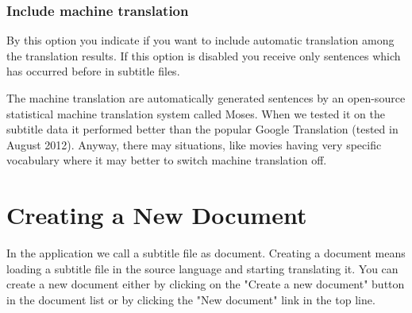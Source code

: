 \subsubsection{Include machine translation}

By this option you indicate if you want to include automatic translation among the translation results. If this option is disabled you receive only sentences which has occurred before in subtitle files.

The machine translation are automatically generated sentences by an open-source statistical machine translation system called Moses. When we tested it on the subtitle data it performed better than the popular Google Translation (tested in August 2012). Anyway, there may situations, like movies having very specific vocabulary where it may better to switch machine translation off.

\section{Creating a New Document}

In the application we call a subtitle file as document. Creating a document means loading a subtitle file in the source language and starting translating it. You can create a new document either by clicking on the "Create a new document" button in the document list or by clicking the "New document" link in the top line.

